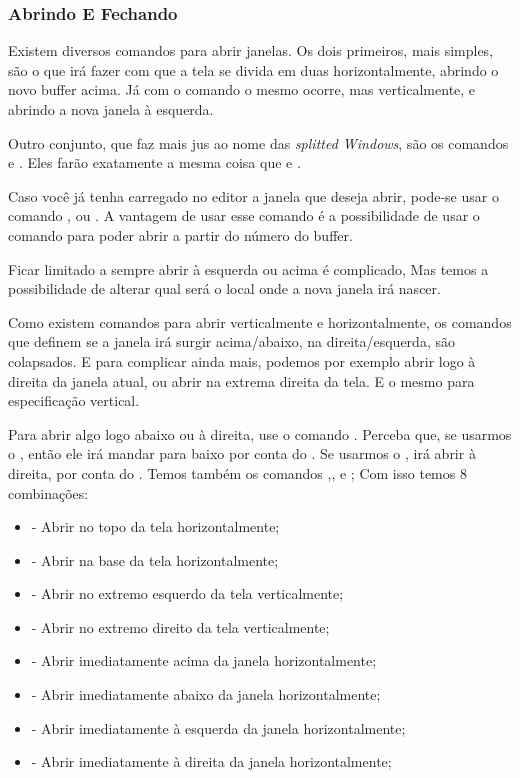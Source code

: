 \documentclass[a4paper, 12pt]{article}
\begin{document}
\subsubsection{Abrindo E Fechando}
Existem diversos comandos para abrir janelas.
Os dois primeiros, mais simples, são o  que irá fazer com que a tela
se divida em duas horizontalmente, abrindo o novo buffer acima.
Já com o comando  o mesmo ocorre, mas verticalmente, e abrindo a nova janela à esquerda.

Outro conjunto, que faz mais jus ao nome das \textit{splitted Windows}, são os comandos  e 
.
Eles farão exatamente a mesma coisa que  e .

Caso você já tenha carregado no editor a janela que deseja abrir, pode-se usar o comando
, ou .
A vantagem de usar esse comando é a possibilidade de usar o comando 
para poder abrir a partir do número do buffer.

Ficar limitado a sempre abrir à esquerda ou acima é complicado,
Mas temos a possibilidade de alterar qual será o local onde a nova janela irá nascer.

Como existem comandos para abrir verticalmente e horizontalmente, os comandos que definem
se a janela irá surgir acima/abaixo, na direita/esquerda, são colapsados.
E para complicar ainda mais, podemos por exemplo abrir logo à direita da janela atual, ou
abrir na extrema direita da tela.
E o mesmo para especificação vertical.

Para abrir algo logo abaixo ou à direita, use o comando .
Perceba que, se usarmos o , então ele irá mandar para baixo por conta do .
Se usarmos o , irá abrir à direita, por conta do .
Temos também os comandos ,, e ;
Com isso temos 8 combinações:

\begin{itemize}
    \item {} - Abrir no topo da tela horizontalmente;
    \item {} - Abrir na base da tela horizontalmente;
    \item {} - Abrir no extremo esquerdo da tela verticalmente;
    \item {} - Abrir no extremo direito da tela verticalmente;
    \item {} - Abrir imediatamente acima da janela horizontalmente;
    \item {} - Abrir imediatamente abaixo da janela horizontalmente;
    \item {} - Abrir imediatamente à esquerda da janela horizontalmente;
    \item {} - Abrir imediatamente à direita da janela horizontalmente;
\end{itemize}
\end{document}
